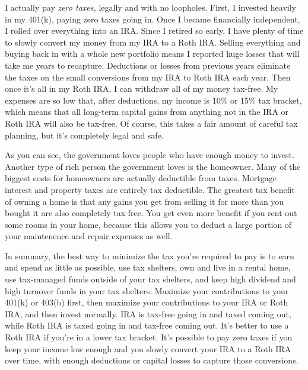 I actually pay \emph{zero taxes,} legally and with no loopholes. First, I invested heavily in my 401(k), paying zero taxes going in. Once I became financially independent, I rolled over everything into an IRA. Since I retired so early, I have plenty of time to slowly convert my money from my IRA to a Roth IRA. Selling everything and buying back in with a whole new portfolio means I reported huge losses that will take me years to recapture. Deductions or losses from previous years eliminate the taxes on the small conversions from my IRA to Roth IRA each year. Then once it's all in my Roth IRA, I can withdraw all of my money tax-free. My expenses are so low that, after deductions, my income is 10\% or 15\% tax bracket, which means that all long-term capital gains from anything not in the IRA or Roth IRA will also be tax-free. Of course, this takes a fair amount of careful tax planning, but it's completely legal and safe.

As you can see, the government loves people who have enough money to invest. Another type of rich person the government loves is the homeowner. Many of the biggest costs for homeowners are actually deductible from taxes. Mortgage interest and property taxes are entirely tax deductible. The greatest tax benefit of owning a home is that any gains you get from selling it for more than you bought it are also completely tax-free. You get even more benefit if you rent out some rooms in your home, because this allows you to deduct a large portion of your maintenence and repair expenses as well.

In summary, the best way to minimize the tax you're required to pay is to earn and spend as little as possible, use tax shelters, own and live in a rental home, use tax-managed funds outside of your tax shelters, and keep high dividend and high turnover funds in your tax shelters. Maximize your contributions to your 401(k) or 403(b) first, then maximize your contributions to your IRA or Roth IRA, and then invest normally. IRA is tax-free going in and taxed coming out, while Roth IRA is taxed going in and tax-free coming out. It's better to use a Roth IRA if you're in a lower tax bracket. It's possible to pay zero taxes if you keep your income low enough and you slowly convert your IRA to a Roth IRA over time, with enough deductions or capital losses to capture those conversions.

\newpage
